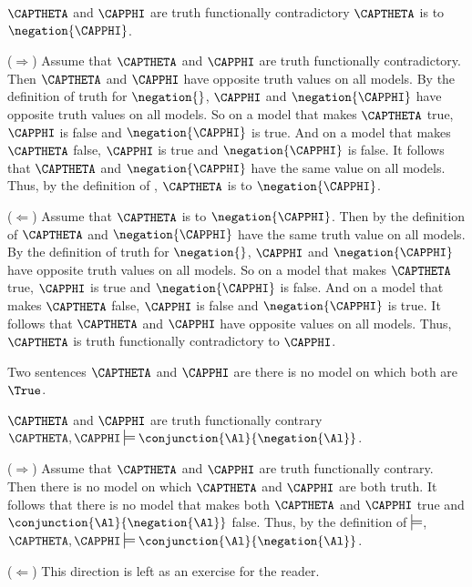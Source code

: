 \begin{THEOREM}{}
	$\CAPTHETA$ and $\CAPPHI$ are truth functionally contradictory \Iff $\CAPTHETA$ is  to $\negation{\CAPPHI}$.
	\begin{PROOF}
		($\Rightarrow$) Assume that $\CAPTHETA$ and $\CAPPHI$ are truth functionally contradictory.
		Then $\CAPTHETA$ and $\CAPPHI$ have opposite truth values on all models.
		By the definition of truth for $\negation{}$, $\CAPPHI$ and $\negation{\CAPPHI}$ have opposite truth values on all models.
		So on a model that makes $\CAPTHETA$ true, $\CAPPHI$ is false and $\negation{\CAPPHI}$ is true.
		And on a model that makes $\CAPTHETA$ false, $\CAPPHI$ is true and $\negation{\CAPPHI}$ is false.
		It follows that $\CAPTHETA$ and $\negation{\CAPPHI}$ have the same value on all models.
		Thus, by the definition of , $\CAPTHETA$ is  to $\negation{\CAPPHI}$.
	
		($\Leftarrow$) Assume that $\CAPTHETA$ is  to $\negation{\CAPPHI}$.
		Then by the definition of  $\CAPTHETA$ and $\negation{\CAPPHI}$ have the same truth value on all models.
		By the definition of truth for $\negation{}$, $\CAPPHI$ and $\negation{\CAPPHI}$ have opposite truth values on all models.
		So on a model that makes $\CAPTHETA$ true, $\CAPPHI$ is true and $\negation{\CAPPHI}$ is false.
		And on a model that makes $\CAPTHETA$ false, $\CAPPHI$ is false and $\negation{\CAPPHI}$ is true.
		It follows that $\CAPTHETA$ and $\CAPPHI$ have opposite values on all models.
		Thus, $\CAPTHETA$ is truth functionally contradictory to $\CAPPHI$.

	\end{PROOF}
\end{THEOREM}

\begin{majorILnc}{}
Two sentences $\CAPTHETA$ and $\CAPPHI$ are  \Iff there is no model on which both are $\True$. 
\end{majorILnc}

\begin{majorILnc}{}
	$\CAPTHETA$ and $\CAPPHI$ are truth functionally contrary \Iff $\CAPTHETA,\CAPPHI\sdtstile{}{}\conjunction{\Al}{\negation{\Al}}$.
\end{majorILnc}
\begin{PROOF} ($\Rightarrow$) Assume that $\CAPTHETA$ and $\CAPPHI$ are truth functionally contrary.
	Then there is no model on which $\CAPTHETA$ and $\CAPPHI$ are both truth.
	It follows that there is no model that makes both $\CAPTHETA$ and $\CAPPHI$ true and $\conjunction{\Al}{\negation{\Al}}$ false.
	Thus, by the definition of $\entails$, $\CAPTHETA,\CAPPHI\sdtstile{}{}\conjunction{\Al}{\negation{\Al}}$.

	($\Leftarrow$) This direction is left as an exercise for the reader.
\end{PROOF}

